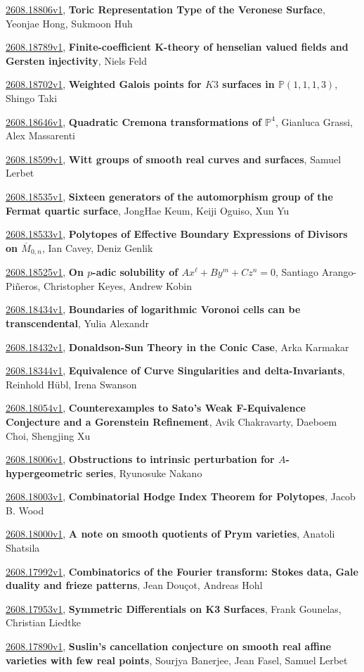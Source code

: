 \documentclass[9pt, a4paper]{article}
\theoremstyle{plain}
\theoremstyle{definition}
\theoremstyle{remark}
\newcommand{\arxiv}[3]{\href{https://arxiv.org/abs/#1}{#1}, \textbf{\textcolor{arxivblue}{#2}}, #3}
\begin{document}
\arxiv{2608.18806v1}{Toric Representation Type of the Veronese Surface}{Yeonjae Hong, Sukmoon Huh}

\arxiv{2608.18789v1}{Finite-coefficient K-theory of henselian valued fields and Gersten injectivity}{Niels Feld}

\arxiv{2608.18702v1}{Weighted Galois points for $K3$ surfaces in $\mathbb{P}(1,1,1, 3)$}{Shingo Taki}

\arxiv{2608.18646v1}{Quadratic Cremona transformations of $\mathbb{P}^4$}{Gianluca Grassi, Alex Massarenti}

\arxiv{2608.18599v1}{Witt groups of smooth real curves and surfaces}{Samuel Lerbet}

\arxiv{2608.18535v1}{Sixteen generators of the automorphism group of the Fermat quartic surface}{JongHae Keum, Keiji Oguiso, Xun Yu}

\arxiv{2608.18533v1}{Polytopes of Effective Boundary Expressions of Divisors on $\overline{M}_{0,n}$}{Ian Cavey, Deniz Genlik}

\arxiv{2608.18525v1}{On $p$-adic solubility of $Ax^\ell + By^m + Cz^n = 0$}{Santiago Arango-Piñeros, Christopher Keyes, Andrew Kobin}

\arxiv{2608.18434v1}{Boundaries of logarithmic Voronoi cells can be transcendental}{Yulia Alexandr}

\arxiv{2608.18432v1}{Donaldson-Sun Theory in the Conic Case}{Arka Karmakar}

\arxiv{2608.18344v1}{Equivalence of Curve Singularities and delta-Invariants}{Reinhold Hübl, Irena Swanson}

\arxiv{2608.18054v1}{Counterexamples to Sato's Weak F-Equivalence Conjecture and a Gorenstein Refinement}{Avik Chakravarty, Daeboem Choi, Shengjing Xu}

\arxiv{2608.18006v1}{Obstructions to intrinsic perturbation for $A$-hypergeometric series}{Ryunosuke Nakano}

\arxiv{2608.18003v1}{Combinatorial Hodge Index Theorem for Polytopes}{Jacob B. Wood}

\arxiv{2608.18000v1}{A note on smooth quotients of Prym varieties}{Anatoli Shatsila}

\arxiv{2608.17992v1}{Combinatorics of the Fourier transform: Stokes data, Gale duality and frieze patterns}{Jean Douçot, Andreas Hohl}

\arxiv{2608.17953v1}{Symmetric Differentials on K3 Surfaces}{Frank Gounelas, Christian Liedtke}

\arxiv{2608.17890v1}{Suslin's cancellation conjecture on smooth real affine varieties with few real points}{Sourjya Banerjee, Jean Fasel, Samuel Lerbet}
\end{document}
